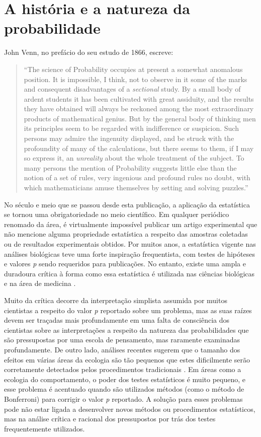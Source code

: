 \section{A história e a natureza da probabilidade}

John Venn, no prefácio do seu estudo de 1866, escreve:

\begin{quote}
``The science of Probability occupies at present a somewhat anomalous position. It is impossible, I think, not to observe
in it some of the marks and consequent disadvantages of a {\em sectional} study. By a small body of ardent students it
has been cultivated with great assiduity, and the results they have obtained will always be reckoned among the most 
extraordinary products of mathematical genius. But by the general body of thinking men its principles seem to be regarded
with indifference or suspicion. Such persons may admire the ingenuity displayed, and be struck with the profoundity
of many of the calculations, but there seems to them, if I may so express it, an {\em unreality} about the whole treatment
of the subject. To many persons the mention of Probability suggests little else than the notion of a set of rules, very
ingenious and profound rules no doubt, with which mathematicians amuse themselves by setting and solving puzzles.''
\citep{Venn1866}
\end{quote}

No século e meio que se passou desde esta publicação, a aplicação da estatística se tornou uma obrigatoriedade no meio científico.
Em qualquer periódico renomado da área, é virtualmente impossível publicar um artigo experimental que não 
mencione alguma propriedade
estatística a respeito das amostras coletadas ou de resultados experimentais obtidos. 
Por muitos anos, a estatística vigente nas análises biológicas teve uma
forte inspiração frequentista, com testes de hipóteses e valores {\em p} sendo requeridos para publicações. 
No entanto, existe uma ampla e duradoura crítica à forma como essa estatística é
utilizada nas ciências biológicas e na área de medicina \citep{Ioannidis05, Burnham11, Barber14, Gardner86}.

Muito da crítica decorre da interpretação
simplista assumida por muitos cientistas a respeito do valor {\em p} reportado sobre um problema, mas as suas raízes devem
ser traçadas mais profundamente em uma falta de consciência dos cientistas sobre as interpretações a respeito da natureza
das probabilidades que são pressupostas por uma escola de pensamento, mas raramente examinadas profundamente. 
De outro lado, análises recentes sugerem que o tamanho dos efeitos em várias áreas da ecologia são tão pequenos que estes
dificilmente serão corretamente detectados pelos procedimentos tradicionais \citep{Jennions03}. Em áreas como a ecologia do
comportamento, o poder dos testes estatísticos é muito pequeno, e esse problema é acentuado quando são utilizados métodos
(como o método de Bonferroni) para corrigir o valor {\em p} reportado. A solução para esses problemas pode não estar ligada
a desenvolver novos métodos ou procedimentos estatísticos, mas na análise crítica e racional dos pressupostos por trás
dos testes frequentemente utilizados.

